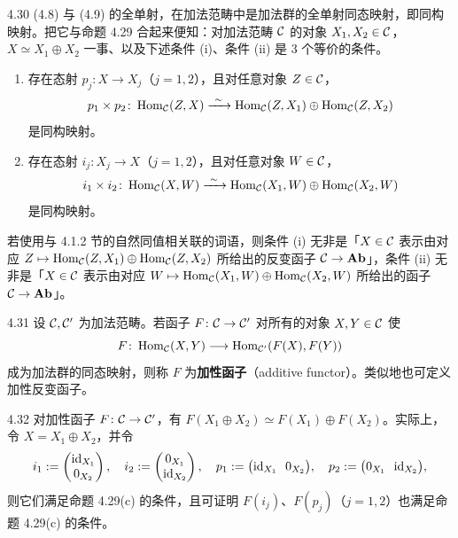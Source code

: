 \begin{remark}{4.30}
(4.8) 与 (4.9) 的全单射，在加法范畴中是加法群的全单射同态映射，即同构映射。把它与命题 4.29 合起来便知：对加法范畴 $\mathcal{C}$ 的对象 $X_1,X_2\in\mathcal{C}$，$X\simeq X_1\oplus X_2$ 一事、以及下述条件 (i)、条件 (ii) 是 3 个等价的条件。
\begin{enumerate}[label=(\roman*)]
  \item 存在态射 $p_j\colon X\to X_j$（$j=1,2$），且对任意对象 $Z\in\mathcal{C}$，
        \[ p_1\times p_2\colon\Hom_{\cC}(Z,X)\xrightarrow{\ \sim\ }\Hom_{\cC}(Z,X_1)\oplus\Hom_{\cC}(Z,X_2) \]
        是同构映射。
  \item 存在态射 $i_j\colon X_j\to X$（$j=1,2$），且对任意对象 $W\in\mathcal{C}$，
        \[ i_1\times i_2\colon\Hom_{\cC}(X,W)\xrightarrow{\ \sim\ }\Hom_{\cC}(X_1,W)\oplus\Hom_{\cC}(X_2,W) \]
        是同构映射。
\end{enumerate}

若使用与 4.1.2 节的自然同值相关联的词语，则条件 (i) 无非是「$X\in\mathcal{C}$ 表示由对应 $Z\mapsto\operatorname{Hom}_{\mathcal{C}}(Z,X_1)\oplus\operatorname{Hom}_{\mathcal{C}}(Z,X_2)$ 所给出的反变函子 $\mathcal{C}\to\mathbf{Ab}$」，条件 (ii) 无非是「$X\in\mathcal{C}$ 表示由对应 $W\mapsto\operatorname{Hom}_{\mathcal{C}}(X_1,W)\oplus\operatorname{Hom}_{\mathcal{C}}(X_2,W)$ 所给出的函子 $\mathcal{C}\to\mathbf{Ab}$」。
\end{remark}

\begin{definition}{4.31}
设 $\mathcal{C},\mathcal{C}'$ 为加法范畴。若函子 $F\colon\mathcal{C}\to\mathcal{C}'$ 对所有的对象 $X,Y\in\mathcal{C}$ 使
\[ F\colon\operatorname{Hom}_{\mathcal{C}}(X,Y)\longrightarrow\operatorname{Hom}_{\mathcal{C}'}(F(X),F(Y)) \]
成为加法群的同态映射，则称 $F$ 为\textbf{加性函子}（additive functor）。类似地也可定义加性反变函子。
\end{definition}

\begin{remark}{4.32}
对加性函子 $F\colon\mathcal{C}\to\mathcal{C}'$，有 $F(X_1\oplus X_2)\simeq F(X_1)\oplus F(X_2)$。实际上，令 $X=X_1\oplus X_2$，并令
\[ i_1:=\begin{pmatrix}\mathrm{id}_{X_1}\\ 0_{X_2}\end{pmatrix},\quad
   i_2:=\begin{pmatrix}0_{X_1}\\ \mathrm{id}_{X_2}\end{pmatrix},\quad
   p_1:=\bigl(\mathrm{id}_{X_1}\ \ 0_{X_2}\bigr),\quad
   p_2:=\bigl(0_{X_1}\ \ \mathrm{id}_{X_2}\bigr), \]
则它们满足命题 4.29(c) 的条件，且可证明 $F(i_j)$、$F(p_j)$（$j=1,2$）也满足命题 4.29(c) 的条件。
\end{remark}

